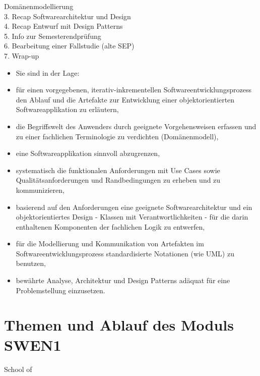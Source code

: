 \documentclass[10pt]{article}
\begin{document}
Domänenmodellierung\\
3. Recap Softwarearchitektur und Design\\
4. Recap Entwurf mit Design Patterns\\
5. Info zur Semesterendprüfung\\
6. Bearbeitung einer Fallstudie (alte SEP)\\
7. Wrap-up

\begin{itemize}
  \item Sie sind in der Lage:
  \item für einen vorgegebenen, iterativ-inkrementellen Softwareentwicklungsprozess den Ablauf und die Artefakte zur Entwicklung einer objektorientierten Softwareapplikation zu erläutern,
  \item die Begriffswelt des Anwenders durch geeignete Vorgehensweisen erfassen und zu einer fachlichen Terminologie zu verdichten (Domänenmodell),
  \item eine Softwareapplikation sinnvoll abzugrenzen,
  \item systematisch die funktionalen Anforderungen mit Use Cases sowie Qualitätsanforderungen und Randbedingungen zu erheben und zu kommunizieren,
  \item basierend auf den Anforderungen eine geeignete Softwarearchitektur und ein objektorientiertes Design - Klassen mit Verantwortlichkeiten - für die darin enthaltenen Komponenten der fachlichen Logik zu entwerfen,
  \item für die Modellierung und Kommunikation von Artefakten im Softwareentwicklungsprozess standardisierte Notationen (wie UML) zu benutzen,
  \item bewährte Analyse, Architektur und Design Patterns adäquat für eine Problemstellung einzusetzen.
\end{itemize}

\section*{Themen und Ablauf des Moduls SWEN1}
School of
\end{document}
